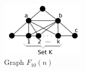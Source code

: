  \begin{figure}[htb]	
 \center%
 \includegraphics[width=4cm]{./img/f10n.png}
 \caption{Graph $F_{10}(n)$}
\label{fig:f10n}
\end{figure}  
 
